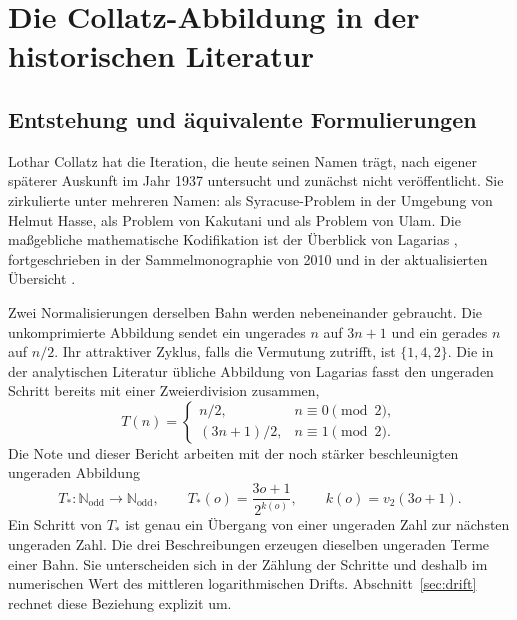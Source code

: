 \documentclass[11pt,a4paper]{article}
\theoremstyle{plain}
\theoremstyle{definition}
\newcommand{\N}{\mathbb{N}}
\numberwithin{equation}{section}
\begin{document}
\section{Die Collatz-Abbildung in der historischen Literatur}

\subsection{Entstehung und äquivalente Formulierungen}

Lothar Collatz hat die Iteration, die heute seinen Namen trägt, nach eigener
späterer Auskunft im Jahr 1937 untersucht und zunächst nicht veröffentlicht.
Sie zirkulierte unter mehreren Namen: als Syracuse-Problem in der Umgebung von
Helmut Hasse, als Problem von Kakutani und als Problem von Ulam.
Die maßgebliche mathematische Kodifikation ist der Überblick von Lagarias
\cite{Lagarias1985}, fortgeschrieben in der Sammelmonographie von 2010 und in
der aktualisierten Übersicht \cite{Lagarias2021}.

Zwei Normalisierungen derselben Bahn werden nebeneinander gebraucht.
Die unkomprimierte Abbildung sendet ein ungerades $n$ auf $3n+1$ und ein
gerades $n$ auf $n/2$.
Ihr attraktiver Zyklus, falls die Vermutung zutrifft, ist $\{1,4,2\}$.
Die in der analytischen Literatur übliche Abbildung von Lagarias fasst den
ungeraden Schritt bereits mit einer Zweierdivision zusammen,
\begin{equation}
\label{eq:Tlagarias}
T(n)=
\begin{cases}
n/2, & n\equiv 0\pmod{2},\\[0.3em]
(3n+1)/2, & n\equiv 1\pmod{2}.
\end{cases}
\end{equation}
Die Note und dieser Bericht arbeiten mit der noch stärker beschleunigten
ungeraden Abbildung
\begin{equation}
\label{eq:Tstar}
T_*:\N_{\mathrm{odd}}\to\N_{\mathrm{odd}},
\qquad
T_*(o)=\frac{3o+1}{2^{k(o)}},
\qquad
k(o)=v_2(3o+1).
\end{equation}
Ein Schritt von $T_*$ ist genau ein Übergang von einer ungeraden Zahl zur
nächsten ungeraden Zahl.
Die drei Beschreibungen erzeugen dieselben ungeraden Terme einer Bahn.
Sie unterscheiden sich in der Zählung der Schritte und deshalb im numerischen
Wert des mittleren logarithmischen Drifts.
Abschnitt~\ref{sec:drift} rechnet diese Beziehung explizit um.
\end{document}
